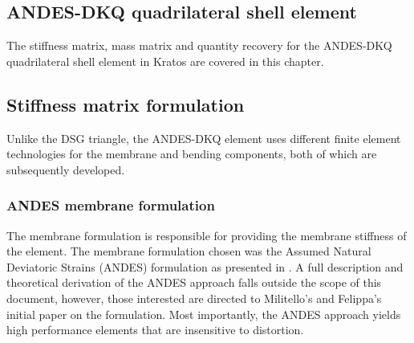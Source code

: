 




\setcounter{MaxMatrixCols}{20}

\begin{flushleft}
	\chapter{ANDES-DKQ quadrilateral shell element}
\end{flushleft}
\renewcommand{\Thema}{ANDES-DKT quadrilateral shell element}

The stiffness matrix, mass matrix and quantity recovery for the ANDES-DKQ quadrilateral shell element in Kratos are covered in this chapter.

\section{Stiffness matrix formulation}

Unlike the DSG triangle, the ANDES-DKQ element uses different finite element technologies for the membrane and bending components, both of which are subsequently developed. 

\subsection{ANDES membrane formulation}

The membrane formulation is responsible for providing the membrane stiffness of the element. The membrane formulation chosen was the Assumed Natural Deviatoric Strains (ANDES) formulation as presented in \cite{Hau94}. A full description and theoretical derivation of the ANDES approach falls outside the scope of this document, however, those interested are directed to Militello's and Felippa's initial paper \cite{Fel91} on the formulation. Most importantly, the ANDES approach yields high performance elements that are insensitive to distortion.

